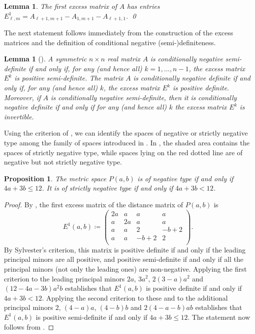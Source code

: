 \documentclass[a4paper, oneside, reqno]{amsart}
\newtheorem{lemma}[theorem]{Lemma}
\newtheorem{prop}[theorem]{Proposition}
\theoremstyle{definition}
\theoremstyle{remark}
\numberwithin{equation}{section}
\begin{document}
\begin{lemma}
\label{lem:excess-formula}
    The first excess matrix of \(A\) has entries
    \(E^1_{\ell, m} = A_{\ell + 1, m + 1} - A_{1, m + 1} - A_{\ell + 1, 1}\). \qed
\end{lemma}

The next statement follows immediately from the construction of the excess matrices and the definition of conditional negative (semi-)definiteness.

\begin{lemma}[{\cite[Lemma~3.5]{HLMT1998}}]
    \label{lem:negative-type-criterion}
    A symmetric \(n \times n\) real matrix \(A\) is conditionally negative semi-definite if and only if, for any (and hence all) \(k = 1, \dots, n-1\), the excess matrix \(E^k\) is positive semi-definite. The matrix \(A\) is conditionally negative definite if and only if, for any (and hence all) \(k\), the excess matrix \(E^k\) is positive definite. Moreover, if \(A\) is conditionally negative semi-definite, then it is conditionally negative definite if and only if for any (and hence all) \(k\) the excess matrix \(E^k\) is invertible.
\end{lemma}

Using the criterion of , we can identify the spaces of negative or strictly negative type among the family of spaces introduced in . In , the shaded area contains the spaces of strictly negative type, while spaces lying on the red dotted line are of negative but not strictly negative type.

\begin{prop}
\label{prop:PQ-negative-type}
The metric space \(P(a, b)\) is of negative type if and only if \(4a + 3b \le 12\). It is of strictly negative type if and only if \(4a + 3b < 12\).
\end{prop}

\begin{proof}
    By , the first excess matrix of the distance matrix of \(P(a,b)\) is
    \[E^1(a,b) \coloneq 
    \begin{pmatrix}
        2a & a & a & a \\
        a & 2a & a & a \\
        a & a & 2 & -b + 2 \\
        a & a & -b + 2 & 2 \\
    \end{pmatrix}.
    \]
    By Sylvester's criterion, this matrix is positive definite if and only if the leading principal minors are all positive, and positive semi-definite if and only if all the principal minors (not only the leading ones) are non-negative. Applying the first criterion to the leading principal minors \(2a\), \(3a^2\), \(2(3- a)a^2\) and \((12 - 4a - 3b)a^2b\) establishes that \(E^1(a,b)\) is positive definite if and only if \(4a + 3b < 12\). Applying the second criterion to these and to the additional principal minors \(2\), \((4 - a)a\), \((4 - b)b\) and \(2(4 - a - b)ab\) establishes that \(E^1(a,b)\) is positive semi-definite if and only if \(4a + 3b \leq 12\). The statement now follows from .
\end{proof}
\end{document}
